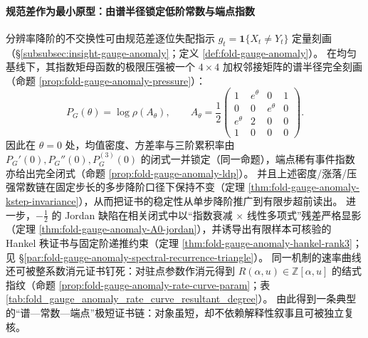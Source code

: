 \paragraph{规范差作为最小原型：由谱半径锁定低阶常数与端点指数}
分辨率降阶的不交换性可由规范差逐位失配指示 \(g_t=\mathbf 1\{X_t\neq Y_t\}\) 定量刻画（\S\ref{subsubsec:insight-gauge-anomaly}；定义 \ref{def:fold-gauge-anomaly}）。
在均匀基线下，其指数矩母函数的极限压强被一个 \(4\times 4\) 加权邻接矩阵的谱半径完全刻画（命题 \ref{prop:fold-gauge-anomaly-pressure}）：
\[
P_G(\theta)=\log\rho(A_\theta),\qquad
A_\theta=\frac12\begin{pmatrix}
1 & e^\theta & 0 & 1\\
0 & 0 & e^\theta & 0\\
e^\theta & 2 & 0 & 0\\
1 & 0 & 0 & 0
\end{pmatrix}.
\]
因此在 \(\theta=0\) 处，均值密度、方差率与三阶累积率由 \(P_G'(0),P_G''(0),P_G^{(3)}(0)\) 的闭式一并锁定（同一命题），端点稀有事件指数亦给出完全闭式（命题 \ref{prop:fold-gauge-anomaly-ldp}）。
并且上述密度/涨落/压强常数链在固定步长的多步降阶口径下保持不变（定理 \ref{thm:fold-gauge-anomaly-kstep-invariance}），从而把证书的稳定性从单步降阶推广到有限步超前读出。
进一步，\(-\tfrac12\) 的 Jordan 缺陷在相关闭式中以“指数衰减 \(\times\) 线性多项式”残差严格显影（定理 \ref{thm:fold-gauge-anomaly-A0-jordan}），并诱导出有限样本可核验的 Hankel 秩证书与固定阶递推约束（定理 \ref{thm:fold-gauge-anomaly-hankel-rank3}；见 \S\ref{par:fold-gauge-anomaly-spectral-recurrence-triangle}）。
同一机制的速率曲线还可被整系数消元证书钉死：对驻点参数作消元得到 \(R(\alpha,u)\in\mathbb Z[\alpha,u]\) 的结式指纹（命题 \ref{prop:fold-gauge-anomaly-rate-curve-param}；表 \ref{tab:fold_gauge_anomaly_rate_curve_resultant_degree}）。
由此得到一条典型的“谱—常数—端点”极短证书链：对象虽短，却不依赖解释性叙事且可被独立复核。

